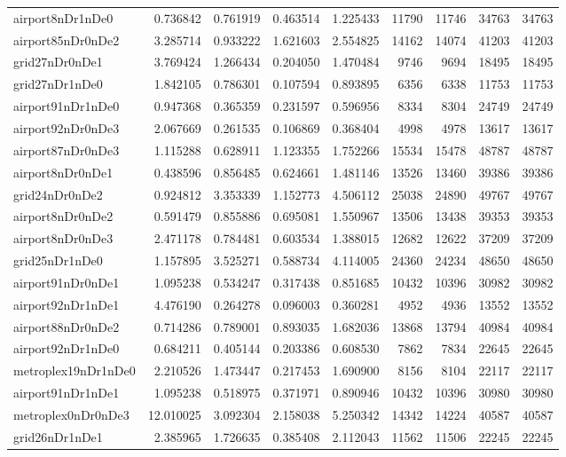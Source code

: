 \begin{longtable}{|l|r|r|r|r|r|r|r|r|}
airport8nDr1nDe0 & 0.736842 & 0.761919 & 0.463514 & 1.225433 & 11790 & 11746 & 34763 & 34763 \\
airport85nDr0nDe2 & 3.285714 & 0.933222 & 1.621603 & 2.554825 & 14162 & 14074 & 41203 & 41203 \\
grid27nDr0nDe1 & 3.769424 & 1.266434 & 0.204050 & 1.470484 & 9746 & 9694 & 18495 & 18495 \\
grid27nDr1nDe0 & 1.842105 & 0.786301 & 0.107594 & 0.893895 & 6356 & 6338 & 11753 & 11753 \\
airport91nDr1nDe0 & 0.947368 & 0.365359 & 0.231597 & 0.596956 & 8334 & 8304 & 24749 & 24749 \\
airport92nDr0nDe3 & 2.067669 & 0.261535 & 0.106869 & 0.368404 & 4998 & 4978 & 13617 & 13617 \\
airport87nDr0nDe3 & 1.115288 & 0.628911 & 1.123355 & 1.752266 & 15534 & 15478 & 48787 & 48787 \\
airport8nDr0nDe1 & 0.438596 & 0.856485 & 0.624661 & 1.481146 & 13526 & 13460 & 39386 & 39386 \\
grid24nDr0nDe2 & 0.924812 & 3.353339 & 1.152773 & 4.506112 & 25038 & 24890 & 49767 & 49767 \\
airport8nDr0nDe2 & 0.591479 & 0.855886 & 0.695081 & 1.550967 & 13506 & 13438 & 39353 & 39353 \\
airport8nDr0nDe3 & 2.471178 & 0.784481 & 0.603534 & 1.388015 & 12682 & 12622 & 37209 & 37209 \\
grid25nDr1nDe0 & 1.157895 & 3.525271 & 0.588734 & 4.114005 & 24360 & 24234 & 48650 & 48650 \\
airport91nDr0nDe1 & 1.095238 & 0.534247 & 0.317438 & 0.851685 & 10432 & 10396 & 30982 & 30982 \\
airport92nDr1nDe1 & 4.476190 & 0.264278 & 0.096003 & 0.360281 & 4952 & 4936 & 13552 & 13552 \\
airport88nDr0nDe2 & 0.714286 & 0.789001 & 0.893035 & 1.682036 & 13868 & 13794 & 40984 & 40984 \\
airport92nDr1nDe0 & 0.684211 & 0.405144 & 0.203386 & 0.608530 & 7862 & 7834 & 22645 & 22645 \\
metroplex19nDr1nDe0 & 2.210526 & 1.473447 & 0.217453 & 1.690900 & 8156 & 8104 & 22117 & 22117 \\
airport91nDr1nDe1 & 1.095238 & 0.518975 & 0.371971 & 0.890946 & 10432 & 10396 & 30980 & 30980 \\
metroplex0nDr0nDe3 & 12.010025 & 3.092304 & 2.158038 & 5.250342 & 14342 & 14224 & 40587 & 40587 \\
grid26nDr1nDe1 & 2.385965 & 1.726635 & 0.385408 & 2.112043 & 11562 & 11506 & 22245 & 22245 \\

\end{longtable}
